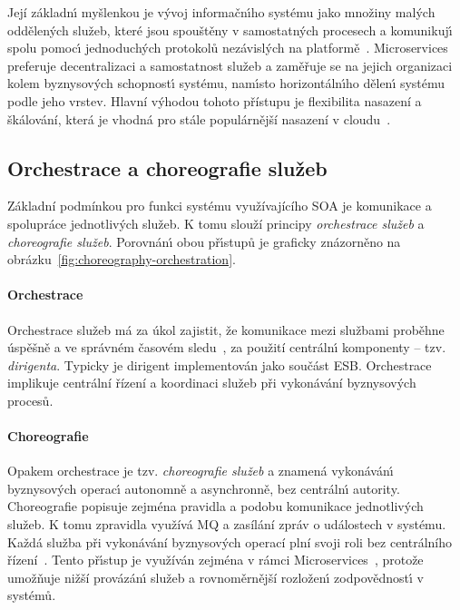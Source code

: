 Její základn\'{\i} myšlenkou je v\'yvoj informačn\'{\i}ho systému jako množiny mal\'ych oddělen\'ych služeb,
které jsou spouštěny v samostatn\'ych procesech a komunikuj\'{\i} spolu pomoc\'{\i} jednoduch\'ych
protokolů nezávislých na platformě~\cite{lewis2014microservices}. Microservices preferuje decentralizaci a samostatnost služeb
a zaměřuje se na jejich organizaci kolem byznysov\'ych schopnost\'{\i} systému, nam\'{\i}sto horizontáln\'{\i}ho
dělen\'{\i} systému podle jeho vrstev. Hlavní výhodou tohoto přístupu je flexibilita nasazení a škálování, která je vhodná
pro stále populárnější nasazení v cloudu~\cite{cerny2018contextual, kratzke2017understanding, xiao2016reflections}.

\subsection{Orchestrace a choreografie služeb}\label{sec:orchestration-vs-choreography}

Základní podmínkou pro funkci systému využívajícího \gls{SOA} je komunikace a spolupráce jednotlivých služeb.
K tomu slouží principy \textit{orchestrace služeb} a \textit{choreografie služeb}. Porovnán\'{\i} obou př\'{\i}stupů
je graficky znázorněno na obrázku~\ref{fig:choreography-orchestration}.

\paragraph{Orchestrace}
Orchestrace služeb má za úkol zajistit, že komunikace mezi službami
proběhne úspěšně a ve správném časovém sledu~\cite{orchestration},
za použití centráln\'{\i} komponenty -- tzv. \textit{dirigenta}.
Typicky je dirigent implementován jako součást \gls{ESB}.
Orchestrace implikuje centrální řízení a koordinaci služeb při
vykonávání byznysových procesů.

\paragraph{Choreografie}
Opakem orchestrace je tzv. \textit{choreografie služeb} a znamená
vykonáván\'{\i} byznysov\'ych operac\'{\i} autonomně a asynchronně, bez centráln\'{\i}
autority. Choreografie popisuje zejména pravidla a podobu komunikace jednotlivých služeb.
K tomu zpravidla využívá \gls{MQ} a zasílání zpráv o událostech v systému. Každá služba
při vykonávání byznysových operací plní svoji roli bez centrálního řízení~\cite{cerny2017disambiguation}.
Tento př\'{\i}stup je využíván zejména v rámci Microservices~\cite{dragoni2017microservices},
protože umožňuje nižší provázán\'{\i} služeb a rovnoměrnější rozložen\'{\i} zodpovědnost\'{\i} v systémů.

